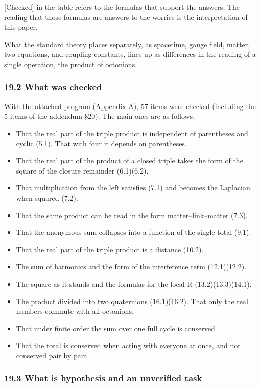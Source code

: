 \documentclass[
  a4paper,
]{article}
\providecommand{\tightlist}{%
  \setlength{\itemsep}{0pt}\setlength{\parskip}{0pt}}
\begin{document}
{[}Checked{]} in the table refers to the formulas that support the
answers. The reading that those formulas are answers to the worries is
the interpretation of this paper.

What the standard theory places separately, as spacetime, gauge field,
matter, two equations, and coupling constants, lines up as differences
in the reading of a single operation, the product of octonions.

\subsubsection{19.2 What was checked}\label{what-was-checked}

With the attached program (Appendix A), 57 items were checked (including
the 5 items of the addendum §20). The main ones are as follows.

\begin{itemize}
\tightlist
\item
  That the real part of the triple product is independent of parentheses
  and cyclic (5.1). That with four it depends on parentheses.
\item
  That the real part of the product of a closed triple takes the form of
  the square of the closure remainder (6.1)(6.2).
\item
  That multiplication from the left satisfies (7.1) and becomes the
  Laplacian when squared (7.2).
\item
  That the same product can be read in the form matter--link--matter
  (7.3).
\item
  That the anonymous sum collapses into a function of the single total
  (9.1).
\item
  That the real part of the triple product is a distance (10.2).
\item
  The sum of harmonics and the form of the interference term
  (12.1)(12.2).
\item
  The square as it stands and the formulas for the local R
  (13.2)(13.3)(14.1).
\item
  The product divided into two quaternions (16.1)(16.2). That only the
  real numbers commute with all octonions.
\item
  That under finite order the sum over one full cycle is conserved.
\item
  That the total is conserved when acting with everyone at once, and not
  conserved pair by pair.
\end{itemize}

\subsubsection{19.3 What is hypothesis and an unverified
task}\label{what-is-hypothesis-and-an-unverified-task}
\end{document}
